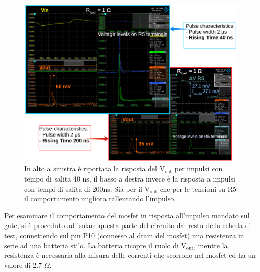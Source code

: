\begin{figure}
\centering
\includegraphics[width=\linewidth]{Immagini/RiseTime}
\caption{In alto a sinistra è riportata la risposta del $\mathrm{V_{out}}$ per impulsi con tempo di salita 40 ns, il basso a destra invece è la risposta a impulsi con tempi di salita di 200ns. Sia per il $\mathrm{V_{out}}$ che per le tensioni su R5 il comportamento migliora rallentando l'impulso.}
\label{RiseTime}
\end{figure}

Per esaminare il comportamento del mosfet in risposta all'impulso mandato sul gate, si è proceduto ad isolare questa parte del circuito dal resto della scheda di test, connettendo sul pin P10 (connesso al drain del mosfet) una resistenza in serie ad una batteria stilo.
La batteria ricopre il ruolo di $\mathrm{V_{out}}$, mentre la resistenza è necessaria alla misura delle correnti che scorrono nel mosfet ed ha un valore di 2.7 $\Omega$. 



